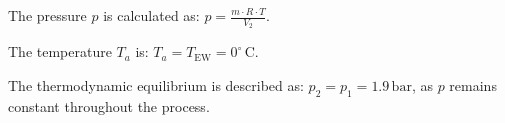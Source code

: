 The pressure \( p \) is calculated as:  
\( p = \frac{m \cdot R \cdot T}{V_2} \).  

The temperature \( T_a \) is:  
\( T_a = T_{\text{EW}} = 0^\circ \, \text{C} \).  

The thermodynamic equilibrium is described as:  
\( p_2 = p_1 = 1.9 \, \text{bar} \), as \( p \) remains constant throughout the process.